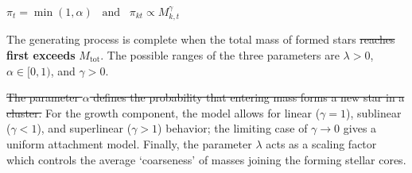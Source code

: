 \documentclass[ejs]{imsart}
\numberwithin{equation}{section}
\theoremstyle{plain}
\newcommand{\new}[1]{{\bf #1}}
\newcommand{\remove}[1]{\st{#1}}
\newcommand{\Mtot}{M_{\text{tot}}}
\begin{document}
\remove{$\pi_t = \min \left (1, \alpha \right ) \;\;\; \text{and} \;\;\; \pi_{kt} \propto M_{k,t}^{\gamma}$}

\noindent The generating process is complete when the total mass of formed stars \remove{reaches} \new{first exceeds} $\Mtot$. 
The possible ranges of the three parameters are $\lambda > 0$, $\alpha \in [0,1)$, and $\gamma > 0$. 

\remove{The parameter $\alpha$ defines the probability that entering mass forms a new star in a cluster.}  For the growth component, the model allows for linear ($\gamma = 1$), sublinear ($\gamma < 1$), and superlinear ($\gamma > 1$) behavior; the limiting case of $\gamma \to 0$ gives a uniform attachment model.  Finally, the parameter $\lambda$ acts as a scaling factor which controls the average `coarseness' of masses joining the forming stellar cores. 
\end{document}
